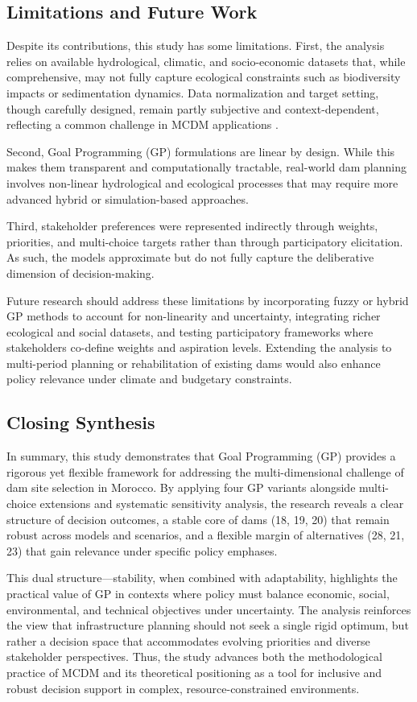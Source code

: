 \subsection{Limitations and Future Work}
Despite its contributions, this study has some limitations.  
First, the analysis relies on available hydrological, climatic, and socio-economic datasets that, while comprehensive, may not fully capture ecological constraints such as biodiversity impacts or sedimentation dynamics. Data normalization and target setting, though carefully designed, remain partly subjective and context-dependent, reflecting a common challenge in MCDM applications \cite{Belton2002,Mardani2015}.  

Second, Goal Programming (GP) formulations are linear by design. While this makes them transparent and computationally tractable, real-world dam planning involves non-linear hydrological and ecological processes that may require more advanced hybrid or simulation-based approaches.  

Third, stakeholder preferences were represented indirectly through weights, priorities, and multi-choice targets rather than through participatory elicitation. As such, the models approximate but do not fully capture the deliberative dimension of decision-making.  

Future research should address these limitations by incorporating fuzzy or hybrid GP methods to account for non-linearity and uncertainty, integrating richer ecological and social datasets, and testing participatory frameworks where stakeholders co-define weights and aspiration levels. Extending the analysis to multi-period planning or rehabilitation of existing dams would also enhance policy relevance under climate and budgetary constraints.

\subsection{Closing Synthesis}
In summary, this study demonstrates that Goal Programming (GP) provides a rigorous yet flexible framework for addressing the multi-dimensional challenge of dam site selection in Morocco. By applying four GP variants alongside multi-choice extensions and systematic sensitivity analysis, the research reveals a clear structure of decision outcomes, a stable core of dams (18, 19, 20) that remain robust across models and scenarios, and a flexible margin of alternatives (28, 21, 23) that gain relevance under specific policy emphases.  

This dual structure—stability, when combined with adaptability, highlights the practical value of GP in contexts where policy must balance economic, social, environmental, and technical objectives under uncertainty. The analysis reinforces the view that infrastructure planning should not seek a single rigid optimum, but rather a decision space that accommodates evolving priorities and diverse stakeholder perspectives. Thus, the study advances both the methodological practice of MCDM and its theoretical positioning as a tool for inclusive and robust decision support in complex, resource-constrained environments.





